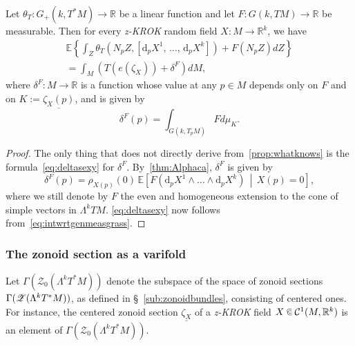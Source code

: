 \documentclass[10pt]{amsart}
\theoremstyle{definition}\newtheorem{defi}[theo]{Definition}\newtheorem{rema}[theo]{Remark}\newtheorem{exam}[theo]{Example}\newtheorem{exem}[theo]{Example}\newtheorem{nota}[theo]{Notation}
\newcommand{\R}{\mathbb{R}}
\newcommand{\EE}{\mathbb{E}}
\newcommand{\ZZ}{\mathscr{Z}}
\newcommand{\dd}{\mathrm{d}}
\newcommand{\mC}{\mathcal{C}}
\newcommand{\seg}{\underline}
\newcommand{\zkrok}{\emph{z-KROK}\xspace}
\newcommand*\randin{
\mathchoice {\raisebox{-.35ex}{$\displaystyle{^\subset}$}\mkern-11.5mu\raisebox{+.45ex}{$\displaystyle{_\subset}$}} {\mkern+1mu\raisebox{-.27ex}{$\textstyle{^\subset}$}\mkern-11.7mu\raisebox{+.45ex}{$\textstyle{_\subset}$}} {\raisebox{.35ex}{$\scriptstyle\subset$}\mkern-14mu\raisebox{-.15ex}{$\scriptstyle\subset$}} {\raisebox{.3ex}{$\scriptscriptstyle\subset$}\mkern-13.5mu\raisebox{-.10ex}{$\scriptscriptstyle\subset$}}}
\begin{document}
\begin{prop}\label{prop:introwhatknows}
Let $\theta_T:G_+(k,T^*M)\to \R$ be a linear function and let $F:G(k,TM)\to \R$ be measurable. Then for every \zkrok random field $X:M\to\R^k$, we have
\begin{multline}\label{eq:introwhatknows}
\EE\left\{\int_Z \theta_T\left( N_pZ,\left[\dd_pX^1,\,\dots,\,\dd_pX^k\right]\right) +F\left( N_pZ\right) dZ\right\}\\
=\int_M \left( T(e(\zeta_X))+\delta^F \right) dM,
\end{multline}
where $\delta^F:M\to \R$ is a function whose value at any $p\in M$ depends only on $F$ and on $K:=\underline{\zeta_X(p)}$, and is given by
\begin{equation}\label{eq:deltasexy}
\delta^F(p)=\int_{G(k,T_pM)}Fd\mu_{K}.
\end{equation}
\end{prop}

\begin{proof}
The only thing that does not directly derive from~\cref{prop:whatknows} is the formula~\eqref{eq:deltasexy} for $\delta^F$. By~\cref{thm:Alphaca}, $\delta^F$ is given by
\begin{equation*}
\delta^F(p)=\rho_{X(p)}(0)\, \EE\left[F\left(\dd_pX^1\wedge \dots \wedge \dd_pX^k\right)\,\middle|\,X(p)=0\right],
\end{equation*}
where we still denote by $F$ the even and homogeneous extension to the cone of simple vectors in $\Lambda^kTM$. \eqref{eq:deltasexy} now follows from~\eqref{eq:intwrtgenmeasgrass}.
\end{proof}


\subsubsection{The zonoid section as a varifold}\label{subsub:varifold}

Let $\Gamma(\ZZ_0(\Lambda^kT^*M))$ denote the subspace of the space of zonoid sections $\Gamma(\ZZ(\Lambda^kT^*\linebreak M))$, as defined in \S~\ref{sub:zonoidbundles}, consisting of centered ones. For instance, the centered zonoid section $ \seg{\zeta_X}$ of a \zkrok field $X\,\randin\, \mC^1(M,\R^k)$ is an element of $\Gamma(\ZZ_0(\Lambda^kT^*M))$.
\end{document}
